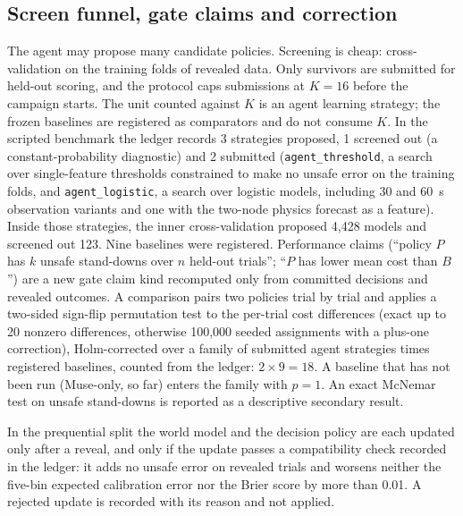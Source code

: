 \documentclass[11pt]{article}
\begin{document}
\subsection{Screen funnel, gate claims and correction}
The agent may propose many candidate policies. Screening is cheap: cross-validation on the training folds of revealed
data. Only survivors are submitted for held-out scoring, and the protocol caps submissions at $K = 16$ before the
campaign starts. The unit counted against $K$ is an agent learning strategy; the frozen baselines are registered as
comparators and do not consume $K$. In the scripted benchmark the ledger records 3 strategies proposed, 1 screened out
(a constant-probability diagnostic) and 2 submitted (\texttt{agent\_threshold}, a search over single-feature
thresholds constrained to make no unsafe error on the training folds, and \texttt{agent\_logistic}, a search over
logistic models, including 30 and 60~s observation variants and one with the two-node physics forecast as a feature).
Inside those strategies, the inner cross-validation proposed 4{,}428 models and screened out 123. Nine baselines were
registered. Performance claims (``policy $P$ has $k$ unsafe stand-downs over $n$ held-out trials''; ``$P$ has lower
mean cost than $B$'') are a new gate claim kind recomputed only from committed decisions and revealed outcomes. A
comparison pairs two policies trial by trial and applies a two-sided sign-flip permutation test to the per-trial cost
differences (exact up to 20 nonzero differences, otherwise 100{,}000 seeded assignments with a plus-one correction),
Holm-corrected \citep{holm1979} over a family of submitted agent strategies times registered baselines, counted from
the ledger: $2 \times 9 = 18$. A baseline that has not been run (Muse-only, so far) enters the family with $p = 1$. An
exact McNemar test on unsafe stand-downs \citep{mcnemar1947} is reported as a descriptive secondary result.

In the prequential split the world model and the decision policy are each updated only after a reveal, and only if
the update passes a compatibility check recorded in the ledger: it adds no unsafe error on revealed trials and worsens
neither the five-bin expected calibration error nor the Brier score by more than 0.01. A rejected update is recorded
with its reason and not applied.
\end{document}
